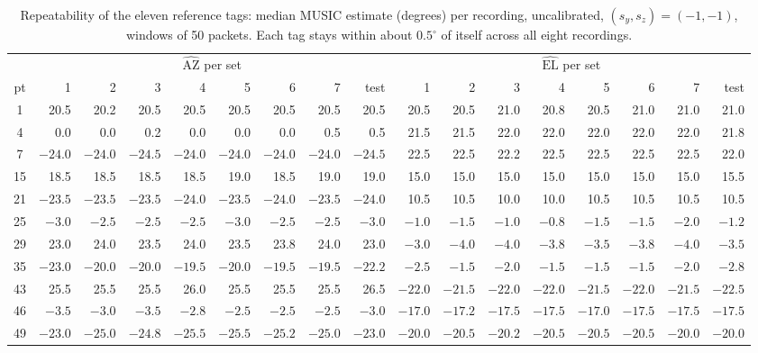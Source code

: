\documentclass[11pt,a4paper]{article}
\begin{document}
\begin{table}[htbp]\centering\footnotesize\setlength{\tabcolsep}{1.8pt}
\begin{tabular}{c|rrrrrrrr|rrrrrrrr}
\toprule
 & \multicolumn{8}{c|}{$\widehat{\mathrm{AZ}}$ per set} & \multicolumn{8}{c}{$\widehat{\mathrm{EL}}$ per set} \\
pt & 1 & 2 & 3 & 4 & 5 & 6 & 7 & test & 1 & 2 & 3 & 4 & 5 & 6 & 7 & test \\
\midrule
1  & 20.5 & 20.2 & 20.5 & 20.5 & 20.5 & 20.5 & 20.5 & 20.5 & 20.5 & 20.5 & 21.0 & 20.8 & 20.5 & 21.0 & 21.0 & 21.0 \\
4  & 0.0 & 0.0 & 0.2 & 0.0 & 0.0 & 0.0 & 0.5 & 0.5 & 21.5 & 21.5 & 22.0 & 22.0 & 22.0 & 22.0 & 22.0 & 21.8 \\
7  & $-24.0$ & $-24.0$ & $-24.5$ & $-24.0$ & $-24.0$ & $-24.0$ & $-24.0$ & $-24.5$ & 22.5 & 22.5 & 22.2 & 22.5 & 22.5 & 22.5 & 22.5 & 22.0 \\
15 & 18.5 & 18.5 & 18.5 & 18.5 & 19.0 & 18.5 & 19.0 & 19.0 & 15.0 & 15.0 & 15.0 & 15.0 & 15.0 & 15.0 & 15.0 & 15.5 \\
21 & $-23.5$ & $-23.5$ & $-23.5$ & $-24.0$ & $-23.5$ & $-24.0$ & $-23.5$ & $-24.0$ & 10.5 & 10.5 & 10.0 & 10.0 & 10.5 & 10.5 & 10.5 & 10.5 \\
25 & $-3.0$ & $-2.5$ & $-2.5$ & $-2.5$ & $-3.0$ & $-2.5$ & $-2.5$ & $-3.0$ & $-1.0$ & $-1.5$ & $-1.0$ & $-0.8$ & $-1.5$ & $-1.5$ & $-2.0$ & $-1.2$ \\
29 & 23.0 & 24.0 & 23.5 & 24.0 & 23.5 & 23.8 & 24.0 & 23.0 & $-3.0$ & $-4.0$ & $-4.0$ & $-3.8$ & $-3.5$ & $-3.8$ & $-4.0$ & $-3.5$ \\
35 & $-23.0$ & $-20.0$ & $-20.0$ & $-19.5$ & $-20.0$ & $-19.5$ & $-19.5$ & $-22.2$ & $-2.5$ & $-1.5$ & $-2.0$ & $-1.5$ & $-1.5$ & $-1.5$ & $-2.0$ & $-2.8$ \\
43 & 25.5 & 25.5 & 25.5 & 26.0 & 25.5 & 25.5 & 25.5 & 26.5 & $-22.0$ & $-21.5$ & $-22.0$ & $-22.0$ & $-21.5$ & $-22.0$ & $-21.5$ & $-22.5$ \\
46 & $-3.5$ & $-3.0$ & $-3.5$ & $-2.8$ & $-2.5$ & $-2.5$ & $-2.5$ & $-3.0$ & $-17.0$ & $-17.2$ & $-17.5$ & $-17.5$ & $-17.0$ & $-17.5$ & $-17.5$ & $-17.5$ \\
49 & $-23.0$ & $-25.0$ & $-24.8$ & $-25.5$ & $-25.5$ & $-25.2$ & $-25.0$ & $-23.0$ & $-20.0$ & $-20.5$ & $-20.2$ & $-20.5$ & $-20.5$ & $-20.5$ & $-20.0$ & $-20.0$ \\
\bottomrule
\end{tabular}
\caption{Repeatability of the eleven reference tags: median MUSIC estimate (degrees) per recording, uncalibrated, $(s_y, s_z) = (-1,-1)$, windows of 50 packets. Each tag stays within about $0.5^\circ$ of itself across all eight recordings.}\label{tab:refsets}
\end{table}
\end{document}
